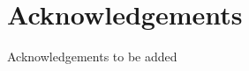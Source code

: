 \chapter*{Acknowledgements}
Acknowledgements to be added

\setcounter{tocdepth}{2}

\listoffigures

\tableofcontents

